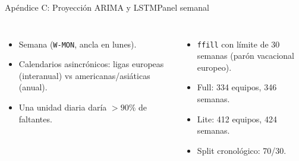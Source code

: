 \documentclass[aspectratio=169,11pt]{beamer}
\begin{document}
\begin{frame}{Ap\'endice C: Proyecci\'on ARIMA y LSTM}{Panel semanal}
	\begin{columns}[T,onlytextwidth]
		\par\vskip 2mm
		\footnotesize
		\begin{itemize}
			\item Semana (\texttt{W-MON}, ancla en lunes).
			\item Calendarios asincr\'onicos: ligas europeas (interanual) vs americanas/asi\'aticas (anual).
			\item Una unidad diaria dar\'ia $>90\%$ de faltantes.
		\end{itemize}
		\par\vskip 2mm
		\footnotesize
		\begin{itemize}
			\item \texttt{ffill} con l\'imite de 30 semanas (par\'on vacacional europeo).
			\item Full: 334 equipos, 346 semanas.
			\item Lite: 412 equipos, 424 semanas.
			\item Split cronol\'ogico: 70/30.
		\end{itemize}
	\end{columns}
	\vskip 1mm
\end{frame}
\end{document}
